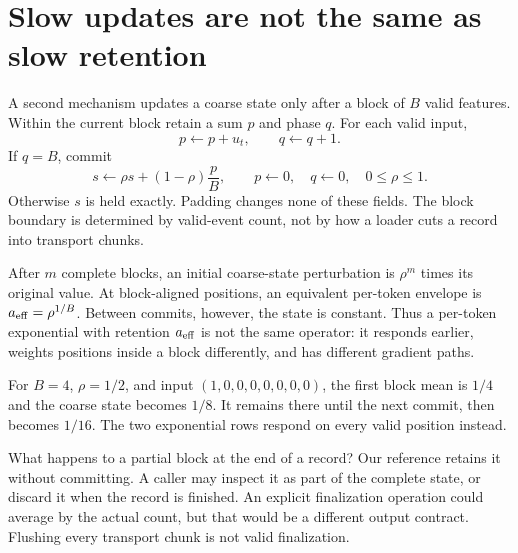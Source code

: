\section{Slow updates are not the same as slow retention}

A second mechanism updates a coarse state only after a block of $B$ valid
features. Within the current block retain a sum $p$ and phase $q$.
For each valid input,
\begin{equation}
 p\leftarrow p+u_t,\qquad q\leftarrow q+1.
\end{equation}
If $q=B$, commit
\begin{equation}
 s\leftarrow\rho s+(1-\rho)\frac{p}{B},\qquad
 p\leftarrow0,\quad q\leftarrow0,
 \quad 0\leq\rho\leq1.
 \label{eq:commit}
\end{equation}
Otherwise $s$ is held exactly. Padding changes none of these fields.
The block boundary is determined by valid-event count, not by how a loader
cuts a record into transport chunks.

After $m$ complete blocks, an initial coarse-state perturbation is
$\rho^m$ times its original value. At block-aligned positions,
an equivalent per-token envelope is $a_{\rm eff}=\rho^{1/B}$.
Between commits, however, the state is constant. Thus a per-token exponential
with retention $a_{\rm eff}$ is not the same operator: it responds earlier,
weights positions inside a block differently, and has different gradient paths.


For $B=4$, $\rho=1/2$, and input $(1,0,0,0,0,0,0,0)$, the first block
mean is $1/4$ and the coarse state becomes $1/8$. It remains there until
the next commit, then becomes $1/16$. The two exponential rows respond on
every valid position instead.
\begin{center}\end{center}

What happens to a partial block at the end of a record? Our reference retains
it without committing. A caller may inspect it as part of the complete state,
or discard it when the record is finished. An explicit finalization operation
could average by the actual count, but that would be a different output
contract. Flushing every transport chunk is not valid finalization.

